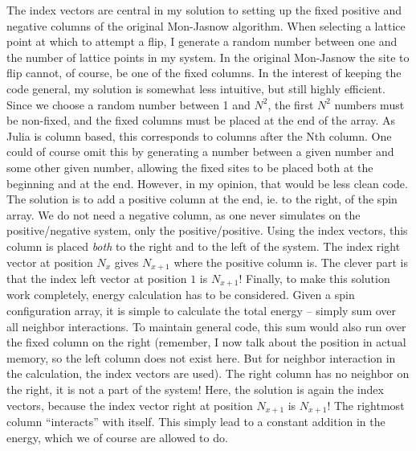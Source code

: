 \documentclass[12pt, a4paper]{article}
\begin{document}
The index vectors are central in my solution to setting up the fixed positive and negative columns of the original Mon-Jasnow algorithm.
When selecting a lattice point at which to attempt a flip, I generate a random number between one and the number of lattice points in my system.
In the original Mon-Jasnow the site to flip cannot, of course, be one of the fixed columns.
In the interest of keeping the code general, my solution is somewhat less intuitive, but still highly efficient.
Since we choose a random number between 1 and $N^2$, the first $N^2$ numbers must be non-fixed, and the fixed columns must be placed at the end of the array.
As Julia is column based, this corresponds to columns after the Nth column.
One could of course omit this by generating a number between a given number and some other given number, allowing the fixed sites to be placed both at the beginning and at the end. However, in my opinion, that would be less clean code.
The solution is to add a positive column at the end, ie. to the right, of the spin array.
We do not need a negative column, as one never simulates on the positive/negative system, only the positive/positive.
Using the index vectors, this column is placed \emph{both} to the right and to the left of the system.
The index right vector at position $N_x$ gives $N_{x+1}$ where the positive column is.
The clever part is that the index left vector at position $1$ is $N_{x+1}$!
Finally, to make this solution work completely, energy calculation has to be considered.
Given a spin configuration array, it is simple to calculate the total energy -- simply sum over all neighbor interactions.
To maintain general code, this sum would also run over the fixed column on the right (remember, I now talk about the position in actual memory, so the left column does not exist here. But for neighbor interaction in the calculation, the index vectors are used).
The right column has no neighbor on the right, it is not a part of the system!
Here, the solution is again the index vectors, because the index vector right at position $N_{x+1}$ is $N_{x+1}$!
The rightmost column ``interacts'' with itself.
This simply lead to a constant addition in the energy, which we of course are allowed to do.
\end{document}
